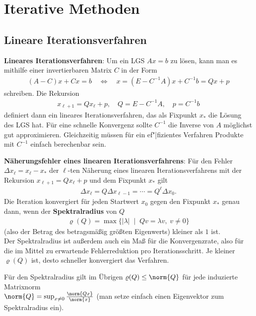 \section{%
    Iterative Methoden%
}

\subsection{%
    Lineare Iterationsverfahren%
}

\textbf{Lineares Iterationsverfahren}:
Um ein LGS $Ax = b$ zu lösen, kann man es mithilfe einer
invertierbaren Matrix $C$ in der Form
\begin{align*}
    (A - C)x + Cx = b
    \quad\Leftrightarrow\quad
    x = (E - C^{-1}A)x + C^{-1}b = Qx + p
\end{align*}
schreiben.
Die Rekursion
\begin{align*}
    x_{\ell+1} = Qx_\ell + p, \quad
    Q = E - C^{-1}A, \quad
    p = C^{-1}b
\end{align*}
definiert dann ein lineares Iterationsverfahren, das als Fixpunkt $x_\ast$
die Lösung des LGS hat.
Für eine schnelle Konvergenz sollte $C^{-1}$ die Inverse von $A$ möglichst
gut approximieren.
Gleichzeitig müssen für ein ef"|fizientes Verfahren Produkte mit $C^{-1}$
einfach berechenbar sein.

\linie

\textbf{Näherungsfehler eines linearen Iterationsverfahrens}:
Für den Fehler $\Delta x_\ell = x_\ell - x_\ast$ der $\ell$-ten Näherung
eines linearen Iterationsverfahrens mit der Rekursion
$x_{\ell+1} = Qx_\ell + p$ und dem Fixpunkt $x_\ast$ gilt
\begin{align*}
    \Delta x_\ell
    = Q \Delta x_{\ell-1}
    = \dotsb
    = Q^\ell \Delta x_0.
\end{align*}
Die Iteration konvergiert für jeden Startwert $x_0$ gegen den Fixpunkt
$x_\ast$ genau dann, wenn der \textbf{Spektralradius} von $Q$
\begin{align*}
    \varrho(Q) = \max\{|\lambda| \;\;|\;\; Qv = \lambda v,\; v \not= 0\}
\end{align*}
(also der Betrag des betragsmäßig größten Eigenwerts) kleiner als $1$ ist. \\
Der Spektralradius ist außerdem auch ein Maß für die Konvergenzrate, also für
die im Mittel zu erwartende Fehlerreduktion pro Iterationsschritt.
Je kleiner $\varrho(Q)$ ist, desto schneller konvergiert das Verfahren.

Für den Spektralradius gilt im Übrigen $\varrho(Q) \le \norm{Q}$ für jede
induzierte Matrixnorm \\
$\norm{Q} = \sup_{x \not= 0} \frac{\norm{Qx}}{\norm{x}}$
(man setze einfach einen Eigenvektor zum Spektralradius ein).

